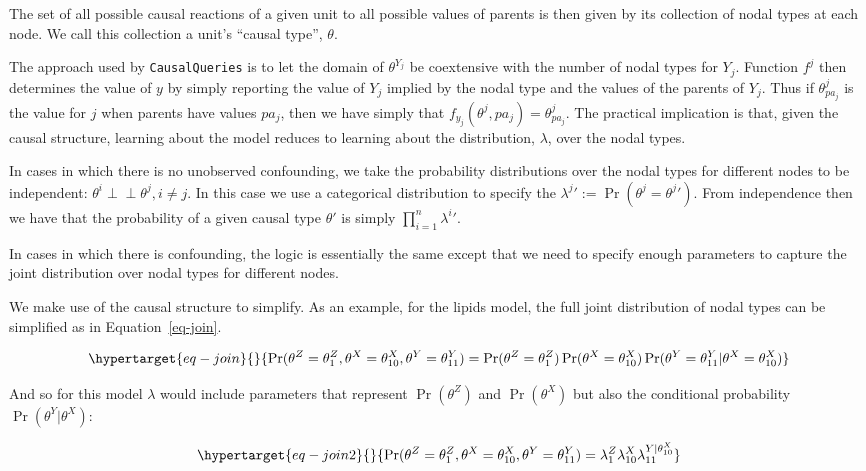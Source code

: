 \documentclass[
  11pt,
  article]{jss}
\begin{document}
The set of all possible causal reactions of a given unit to all possible
values of parents is then given by its collection of nodal types at each
node. We call this collection a unit's ``causal type'', \(\theta\).

The approach used by \texttt{CausalQueries} is to let the domain of
\(\theta^{Y_j}\) be coextensive with the number of nodal types for
\(Y_j\). Function \(f^j\) then determines the value of \(y\) by simply
reporting the value of \(Y_j\) implied by the nodal type and the values
of the parents of \(Y_j\). Thus if \(\theta^j_{pa_j}\) is the value for
\(j\) when parents have values \(pa_j\), then we have simply that
\(f_{y_j}(\theta^{j}, pa_j) = \theta^j_{pa_j}\). The practical
implication is that, given the causal structure, learning about the
model reduces to learning about the distribution, \(\lambda\), over the
nodal types.

In cases in which there is no unobserved confounding, we take the
probability distributions over the nodal types for different nodes to be
independent: \(\theta^i \perp\!\!\! \perp \theta^j, i\neq j\). In this
case we use a categorical distribution to specify the
\({\lambda^j}' := \Pr(\theta^j = {\theta^j}')\). From independence then
we have that the probability of a given causal type \(\theta'\) is
simply \(\prod_{i=1}^n {\lambda^i}'\).

In cases in which there is confounding, the logic is essentially the
same except that we need to specify enough parameters to capture the
joint distribution over nodal types for different nodes.

We make use of the causal structure to simplify. As an example, for the
lipids model, the full joint distribution of nodal types can be
simplified as in Equation~\ref{eq-join}.

\begin{equation}\protect\hypertarget{eq-join}{}{
\Pr(\theta^Z = \theta^Z_1, \theta^X = \theta^X_{10}, \theta^Y = \theta^Y_{11}) = 
\Pr(\theta^Z = \theta^Z_1)\Pr(\theta^X = \theta^X_{10})\Pr(\theta^Y = \theta^Y_{11}|\theta^X = \theta^X_{10})
}\label{eq-join}\end{equation}

And so for this model \(\lambda\) would include parameters that
represent \(\Pr(\theta^Z)\) and \(\Pr(\theta^X)\) but also the
conditional probability \(\Pr(\theta^Y|\theta^X)\):

\begin{equation}\protect\hypertarget{eq-join2}{}{
\Pr(\theta^Z = \theta^Z_1, \theta^X = \theta^X_{10}, \theta^Y = \theta^Y_{11}) = 
\lambda^Z_1\lambda^X_{10}\lambda^{Y|\theta^X_{10}}_{11}
}\label{eq-join2}\end{equation}
\end{document}
